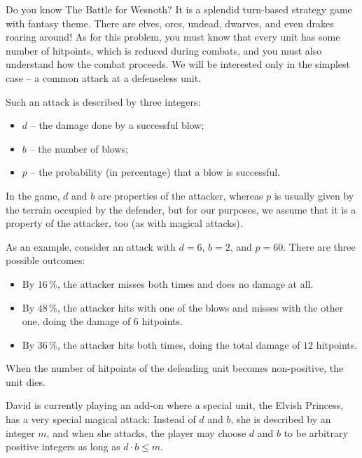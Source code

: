





Do you know The Battle for Wesnoth? It is a splendid turn-based strategy game with fantasy theme.
There are elves, orcs, undead, dwarves, and even drakes roaring around!
As for this problem, you must know that every unit has some number of hitpoints, which is reduced during combats,
and you must also understand how the combat proceeds. We will be interested only in the simplest case --
a common attack at a defenseless unit.

Such an attack is described by three integers:
\begin{itemize}
 \item $d$ -- the damage done by a successful blow;
 \item $b$ -- the number of blows;
 \item $p$ -- the probability (in percentage) that a blow is successful.
\end{itemize}
In the game, $d$ and $b$ are properties of the attacker, whereas $p$ is usually given by the terrain
occupied by the defender, but for our purposes, we assume that it is a property of the attacker, too
(as with magical attacks).

As an example, consider an attack with $d=6$, $b=2$, and $p=60$. There are three possible outcomes:
\begin{itemize}
 \item By $16\,\%$, the attacker misses both times and does no damage at all.
 \item By $48\,\%$, the attacker hits with one of the blows and misses with the other one,
 doing the damage of $6$ hitpoints.
 \item By $36\,\%$, the attacker hits both times, doing the total damage of $12$ hitpoints.
\end{itemize}
When the number of hitpoints of the defending unit becomes non-positive, the unit dies.

David is currently playing an add-on where a special unit, the Elvish Princess, has a very special magical attack:
Instead of $d$ and $b$, she is described by an integer $m$, and when she attacks, the player may choose
$d$ and $b$ to be arbitrary positive integers as long as $d\cdot b\leq m$.

